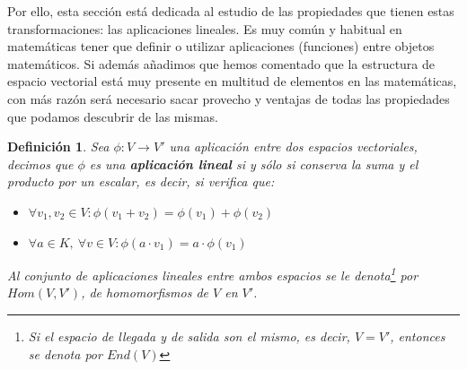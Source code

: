 \documentclass[10pt,a4paper,openright]{book}
\theoremstyle{break}
\newtheorem*{defi}{Definición}
\begin{document}
Por ello, esta sección está dedicada al estudio de las propiedades que tienen estas transformaciones: las aplicaciones lineales. Es muy común y habitual en matemáticas tener que definir o utilizar aplicaciones (funciones) entre objetos matemáticos. Si además añadimos que hemos comentado que la estructura de espacio vectorial está muy presente en multitud de elementos en las matemáticas, con más razón será necesario sacar provecho y ventajas de todas las propiedades que podamos descubrir de las mismas.

\begin{defi}
Sea $\phi:V\longrightarrow V'$ una aplicación entre dos espacios vectoriales, decimos que $\phi$ es una \textbf{aplicación lineal} si y sólo si conserva la suma y el producto por un escalar, es decir, si verifica que:
\begin{itemize}
\item $ \forall v_1,v_2\in V : \phi(v_1+v_2)=\phi(v_1)+\phi(v_2)$
\item $\forall a\in K,\ \forall v\in V : \phi(a\cdot v_1)=a\cdot \phi(v_1)$
\end{itemize}
Al conjunto de aplicaciones lineales entre ambos espacios se le denota\footnote{Si el espacio de llegada y de salida son el mismo, es decir, $V=V'$, entonces se denota por $End(V)$} por $Hom(V,V')$, de \textit{homomorfismos} de $V$ en $V'$.
\end{defi}
\end{document}
